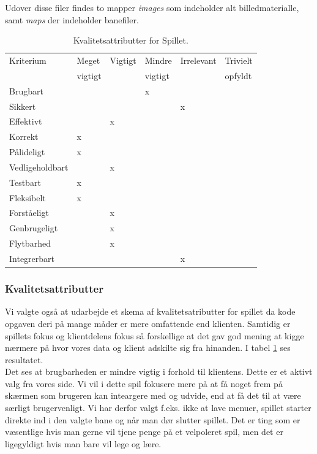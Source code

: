 \documentclass[10pt,a4paper,danish]{article}
\begin{document}
Udover disse filer findes to mapper \textit{images} som indeholder alt billedmaterialle, samt \textit{maps} der indeholder banefiler.


\begin{table}[h!]
  \begin{center}
    \begin{tabular}{llllll}
      \toprule
      Kriterium & Meget   & Vigtigt & Mindre  & Irrelevant & Trivielt \\
                & vigtigt &         & vigtigt &            & opfyldt  \\
      \midrule
      Brugbart        & & &x& & \\
      Sikkert         & & & &x& \\
      Effektivt       & &x& & & \\
      Korrekt         &x& & & & \\
      Pålideligt      &x& & & & \\
      Vedligeholdbart & &x& & & \\
      Testbart        &x& & & & \\
      Fleksibelt      &x& & & & \\
      Forståeligt     & &x& & & \\
      Genbrugeligt    & &x& & & \\
      Flytbarhed      & &x& & & \\
      Integrerbart    & & & &x& \\
      \bottomrule
    \end{tabular}
    \caption{Kvalitetsattributter for Spillet.}
    \label{tab:kvalitetsattributter_spil}
  \end{center}
\end{table}

\subsubsection{Kvalitetsattributter}
Vi valgte også at udarbejde et skema af kvalitetsatributter for spillet da kode opgaven deri på mange måder er mere omfattende end klienten. Samtidig er spillets fokus og klientdelens fokus så forskellige at det gav god mening at kigge nærmere på hvor vores data og klient adskilte sig fra hinanden. I tabel \ref{tab:kvalitetsattributter_spil} ses resultatet.
\\

Det ses at brugbarheden er mindre vigtig i forhold til klientens. Dette er et aktivt valg fra vores side. Vi vil i dette spil fokusere mere på at få noget frem på skærmen som brugeren kan inteargere med og udvide, end at få det til at være særligt brugervenligt. Vi har derfor valgt f.eks. ikke at lave menuer, spillet starter direkte ind i den valgte bane og når man dør slutter spillet.
Det er ting som er væsentlige hvis man gerne vil tjene penge på et velpoleret spil, men det er ligegyldigt hvis man bare vil lege og lære.
\\
\end{document}
